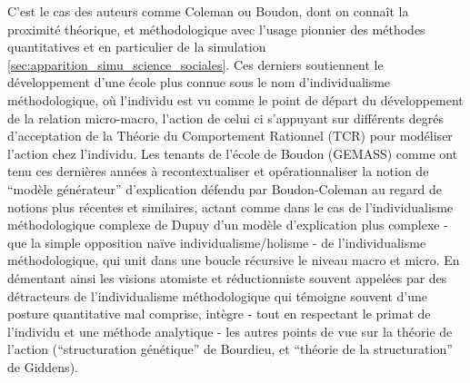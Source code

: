 

C'est le cas des auteurs comme Coleman ou Boudon, dont on connaît la proximité théorique, et méthodologique avec l'usage pionnier des méthodes quantitatives et en particulier de la simulation \ref{sec:apparition_simu_science_sociales}. Ces derniers soutiennent le développement d'une école plus connue sous le nom d'individualisme méthodologique, où l'individu est vu comme le point de départ du développement de la relation micro-macro, l'action de celui ci s'appuyant sur différents degrés d'acceptation de la Théorie du Comportement Rationnel (TCR) pour modéliser l'action chez l'individu. Les tenants de l'école de Boudon (GEMASS) comme \textcite{Manzo2007, Manzo2005} ont tenu ces dernières années à recontextualiser et opérationnaliser  la notion de \enquote{modèle générateur}  d'explication défendu par Boudon-Coleman au regard de notions plus récentes et similaires, actant comme dans le cas de l'individualisme méthodologique complexe de Dupuy d'un modèle d'explication plus complexe - que la simple opposition naïve individualisme/holisme - de l'individualisme méthodologique, qui unit dans une boucle récursive le niveau macro et micro. En démentant ainsi les visions atomiste et réductionniste souvent appelées par des détracteurs de l'individualisme méthodologique qui témoigne souvent d'une posture quantitative mal comprise, \textcite{Manzo2007} intègre - tout en respectant le primat de l'individu et une méthode analytique - les autres points de vue sur la théorie de l'action (\enquote{structuration génétique} de Bourdieu, et \enquote{théorie de la structuration} de Giddens).

